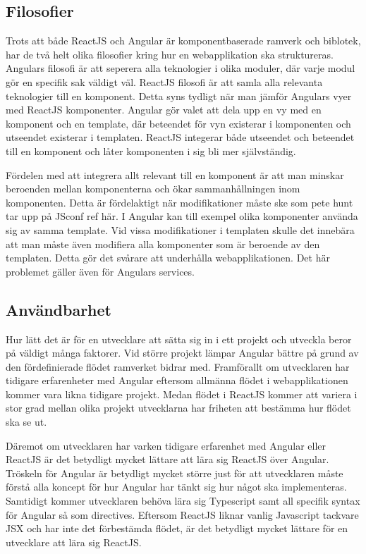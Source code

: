 \subsection{Filosofier}
Trots att både ReactJS och Angular är komponentbaserade ramverk och biblotek, har de två helt olika filosofier kring hur en webapplikation ska struktureras. Angulars filosofi är att seperera alla teknologier i olika moduler, där varje modul gör en specifik sak väldigt väl. ReactJS filosofi är att samla alla relevanta teknologier till en komponent. Detta syns tydligt när man jämför Angulars vyer med ReactJS komponenter. Angular gör valet att dela upp en vy med en komponent och en template, där beteendet för vyn existerar i komponenten och utseendet existerar i templaten. ReactJS integerar både utseendet och beteendet till en komponent och låter komponenten i sig bli mer självständig. 

Fördelen med att integrera allt relevant till en komponent är att man minskar beroenden mellan komponenterna och ökar sammanhållningen inom komponenten. Detta är fördelaktigt när modifikationer måste ske som pete hunt tar upp på JSconf ref här. I Angular kan till exempel olika komponenter använda sig av samma template. Vid vissa modifikationer i templaten skulle det innebära att man måste även modifiera alla komponenter som är beroende av den templaten. Detta gör det svårare att underhålla webapplikationen. Det här problemet gäller även för Angulars services.


\subsection{Användbarhet}
Hur lätt det är för en utvecklare att sätta sig in i ett projekt och utveckla beror på väldigt många faktorer. Vid större projekt lämpar Angular bättre på grund av den fördefinierade flödet ramverket bidrar med. Framförallt om utvecklaren har tidigare erfarenheter med Angular eftersom allmänna flödet i webapplikationen kommer vara likna tidigare projekt. Medan flödet i ReactJS kommer att variera i stor grad mellan olika projekt utvecklarna har friheten att bestämma hur flödet ska se ut. 

Däremot om utvecklaren har varken tidigare erfarenhet med Angular eller ReactJS är det betydligt mycket lättare att lära sig ReactJS över Angular. Tröskeln för Angular är betydligt mycket större just för att utvecklaren måste förstå alla koncept för hur Angular har tänkt sig hur något ska implementeras. Samtidigt kommer utvecklaren behöva lära sig Typescript samt all specifik syntax för Angular så som directives. Eftersom ReactJS liknar vanlig Javascript tackvare JSX och har inte det förbestämda flödet, är det betydligt mycket lättare för en utvecklare att lära sig ReactJS.

